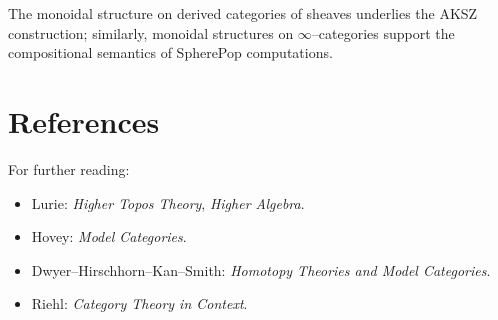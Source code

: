 \begin{remark}
The monoidal structure on derived categories of sheaves underlies the AKSZ
construction; similarly, monoidal structures on $\infty$--categories support
the compositional semantics of SpherePop computations.
\end{remark}

\section*{References}

For further reading:
\begin{itemize}
\item Lurie: \emph{Higher Topos Theory}, \emph{Higher Algebra}.
\item Hovey: \emph{Model Categories}.
\item Dwyer--Hirschhorn--Kan--Smith: \emph{Homotopy Theories and Model Categories}.
\item Riehl: \emph{Category Theory in Context}.
\end{itemize}


